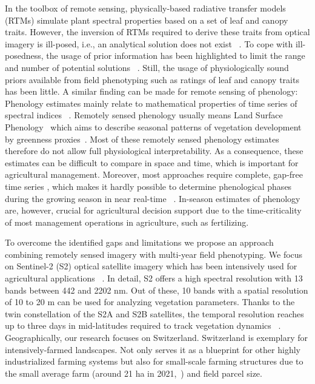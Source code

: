In the toolbox of remote sensing, physically-based radiative transfer models (RTMs) simulate plant spectral properties based on a set of leaf and canopy traits. However, the inversion of RTMs required to derive these traits from optical imagery is ill-posed, i.e., an analytical solution does not exist ~\citep{combal_retrieval_2002,atzberger_object-based_2004}. To cope with ill-posedness, the usage of prior information has been highlighted to limit the range and number of potential solutions ~\citep[for example]{lauvernet_multitemporal-patch_2008}. Still, the usage of physiologically sound priors available from field phenotyping such as ratings of leaf and canopy traits has been little. A similar finding can be made for remote sensing of phenology: Phenology estimates mainly relate to mathematical properties of time series of spectral indices ~\citep{de_beurs_land_2004,garonna_variability_2016,peng_scaling_2017,bolton_continental-scale_2020}. Remotely sensed phenology usually means Land Surface Phenology~\citep{de_beurs_land_2004} which aims to describe seasonal patterns of vegetation development by greenness proxies~\citep{helman_land_2018}. Most of these remotely sensed phenology estimates therefore do not allow full physiological interpretability. As a consequence, these estimates can be difficult to compare in space and time, which is important for agricultural management. Moreover, most approaches require complete, gap-free time series \citep[for instance]{lobert_deep_2023}, which makes it hardly possible to determine phenological phases during the growing season in near real-time ~\citep{liao_near_2023}. In-season estimates of phenology are, however, crucial for agricultural decision support due to the time-criticality of most management operations in agriculture, such as fertilizing.

To overcome the identified gaps and limitations we propose an approach combining remotely sensed imagery with multi-year field phenotyping. We focus on Sentinel-2 (S2) optical satellite imagery which has been intensively used for agricultural applications ~\citep{delloye_retrieval_2018,meroni_comparing_2021,chen_improving_2022}. In detail, S2 offers a high spectral resolution with 13 bands between 442 and 2202 nm. Out of these, 10 bands with a spatial resolution of 10 to 20 m can be used for analyzing vegetation parameters. Thanks to the twin constellation of the S2A and S2B satellites, the temporal resolution reaches up to three days in mid-latitudes required to track vegetation dynamics ~\citep{frampton_evaluating_2013}. Geographically, our research focuses on Switzerland. Switzerland is exemplary for intensively-farmed landscapes. Not only serves it as a blueprint for other highly industrialized farming systems but also for small-scale farming structures due to the small average farm (around 21 ha in 2021,~\citep{federal_statistical_office_landwirtschaft_2022}) and field parcel size. 

